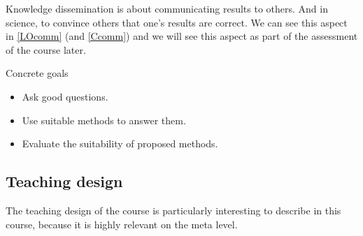 Knowledge dissemination is about communicating results to others.
And in science, to convince others that one's results are correct.
We can see this aspect in \ref{LOcomm} (and \ref{Ccomm}) and we will see this 
aspect as part of the assessment of the course later.

\begin{frame}
  \begin{block}{Concrete goals}
    \begin{itemize}
      \item Ask good questions.
      \item Use suitable methods to answer them.
      \item Evaluate the suitability of proposed methods.
    \end{itemize}
  \end{block}
\end{frame}


\subsection{Teaching design}

The teaching design of the course is particularly interesting to describe in 
this course, because it is highly relevant on the meta level.

